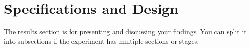 \section{Specifications and Design}
The results section is for presenting and discussing your findings.  You can split it into subsections if the experiment has multiple sections or stages.


